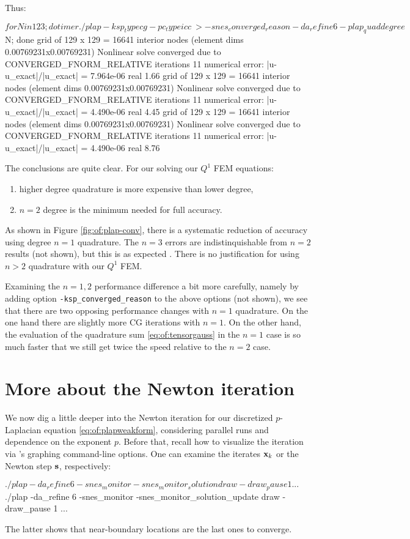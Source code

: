 Thus:
\begin{cline}
$ for N in 1 2 3; do timer ./plap -ksp_type cg -pc_type icc \
>   -snes_converged_reason -da_refine 6 -plap_quaddegree $N; done
grid of 129 x 129 = 16641 interior nodes (element dims 0.00769231x0.00769231)
Nonlinear solve converged due to CONVERGED_FNORM_RELATIVE iterations 11
numerical error:  |u-u_exact|/|u_exact| = 7.964e-06
real 1.66
grid of 129 x 129 = 16641 interior nodes (element dims 0.00769231x0.00769231)
Nonlinear solve converged due to CONVERGED_FNORM_RELATIVE iterations 11
numerical error:  |u-u_exact|/|u_exact| = 4.490e-06
real 4.45
grid of 129 x 129 = 16641 interior nodes (element dims 0.00769231x0.00769231)
Nonlinear solve converged due to CONVERGED_FNORM_RELATIVE iterations 11
numerical error:  |u-u_exact|/|u_exact| = 4.490e-06
real 8.76
\end{cline}
The conclusions are quite clear.  For our solving our $Q^1$ FEM equations:
\renewcommand{\labelenumi}{\emph{(\roman{enumi})}}
\begin{enumerate}
\item higher degree quadrature is more expensive than lower degree,
\item $n=2$ degree is the minimum needed for full accuracy.
\end{enumerate}

As shown in Figure \ref{fig:of:plap-conv}, there is a systematic reduction of accuracy using degree $n=1$ quadrature.  The $n=3$ errors are indistinquishable from $n=2$ results (not shown), but this is as expected \citep[subsection 1.4.2]{Elmanetal2005}.  There is no justification for using $n>2$ quadrature with our $Q^1$ FEM.

Examining the $n=1,2$ performance difference a bit more carefully, namely by adding option \texttt{-ksp\_converged\_reason} to the above options (not shown), we see that there are two opposing performance changes with $n=1$ quadrature.  On the one hand there are slightly more CG iterations with $n=1$.  On the other hand, the evaluation of the quadrature sum \eqref{eq:of:tensorgauss} in the $n=1$ case is so much faster that we still get twice the speed relative to the $n=2$ case.


\section{More about the Newton iteration}

We now dig a little deeper into the Newton iteration for our discretized $p$-Laplacian equation \eqref{eq:of:plapweakform}, considering parallel runs and dependence on the exponent $p$.  Before that, recall how to visualize the iteration via \PETSc's graphing command-line options.  One can examine the iterates $\mathbf{x}_k$ or the Newton step $\mathbf{s}$, respectively:
\begin{cline}
$ ./plap -da_refine 6 -snes_monitor -snes_monitor_solution draw -draw_pause 1
...
$ ./plap -da_refine 6 -snes_monitor -snes_monitor_solution_update draw -draw_pause 1
...
\end{cline}
The latter shows that near-boundary locations are the last ones to converge.

